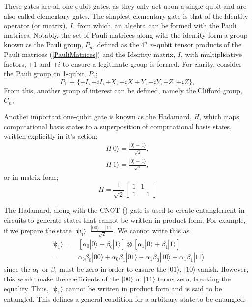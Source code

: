 These gates are all one-qubit gates, as they only act upon a single qubit and are also called elementary gates.
The simplest elementary gate is that of the Identity operator (or matrix), $I$, from which, an algebra
can be formed with the Pauli matrices. Notably, the set of Pauli matrices along with the identity form
a group known as the Pauli group, $P_n$, defined as the $4^n$ $n$-qubit tensor products of the Pauli matrices (\ref{PauliMatrices}) and the
Identity matrix, $I$, with multiplicative factors, $\pm 1$ and $\pm i$ to ensure a legitimate group is formed.
For clarity, consider the Pauli group on 1-qubit, $P_1$;
\begin{equation}
    P_1 \equiv \{ \pm I, \pm iI, \pm X, \pm iX \pm Y, \pm iY, \pm Z, \pm iZ\},
\end{equation}
From this, another group of interest can be defined, namely the Clifford group, $C_n$,



Another important one-qubit gate is
known as the Hadamard, $H$, which maps computational basis states to a superposition of computational basis states,
written explicitly in it's action;
\begin{align*}
    H |0\rangle = \frac{|0\rangle + |1\rangle}{\sqrt{2}}, \\
    H |1\rangle = \frac{|0\rangle - |1\rangle}{\sqrt{2}},
\end{align*}
or in matrix form;
\begin{equation*}
    H = \frac{1}{\sqrt{2}} \begin{bmatrix}
        1 & 1  \\
        1 & -1
    \end{bmatrix}
\end{equation*}

The Hadamard, along with the CNOT () gate is used to create entanglement in circuits to
generate states that cannot be written in product form. For example, if we prepare the state
$|{\bm\psi}_1\rangle_ = \frac{|00\rangle + |11\rangle}{\sqrt{2}}$. We cannot write this as
\begin{align*}
    |{\bm\psi}_1\rangle = & \left[ \alpha_0 |0\rangle + \beta_0|1\rangle\right] \otimes \left[\alpha_1 |0\rangle + \beta_1|1\rangle\right] \\
    =                     & \alpha_0\beta_0 |00\rangle + \alpha_0\beta_1|01\rangle + \alpha_1\beta_0|10\rangle + \alpha_1\beta_1|11\rangle
\end{align*}
since the $\alpha_0$ or $\beta_1$ must be zero in order to ensure the $|01\rangle$, $|10\rangle$ vanish.
However, this would make the coefficients of the $|00\rangle$
or $|11\rangle$ terms zero, breaking the equality. Thus, $|{\bm\psi}_1\rangle$ cannot be written in
product form and is said to be entangled. This defines a general condition for a arbitrary state to be entangled.


